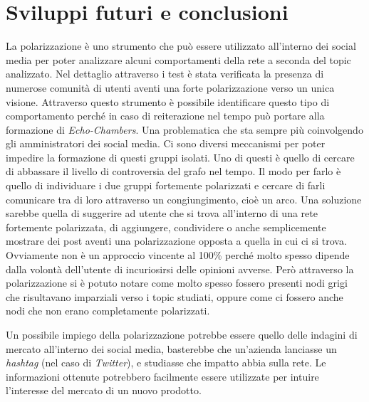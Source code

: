 \chapter{Sviluppi futuri e conclusioni}
\label{capitolo7}
\thispagestyle{empty}


La polarizzazione è uno strumento che può essere utilizzato all'interno dei social media per poter analizzare alcuni comportamenti della rete a seconda del topic analizzato. Nel dettaglio attraverso i test è stata verificata la presenza di numerose comunità di utenti aventi una forte polarizzazione verso un unica visione. Attraverso questo strumento è possibile identificare questo tipo di comportamento perché in caso di reiterazione nel tempo può portare alla formazione di \textit{Echo-Chambers}. Una problematica che sta sempre più coinvolgendo gli amministratori dei social media.
Ci sono diversi meccanismi per poter impedire la formazione di questi gruppi isolati. Uno di questi è quello di cercare di abbassare il livello di controversia del grafo nel tempo. Il modo per farlo è quello di individuare i due gruppi fortemente polarizzati e cercare di farli comunicare tra di loro attraverso un congiungimento, cioè un arco.
Una soluzione sarebbe quella di suggerire ad utente che si trova all'interno di una rete fortemente polarizzata, di aggiungere, condividere o anche semplicemente mostrare dei post aventi una polarizzazione opposta a quella in cui ci si trova. 
Ovviamente non è un approccio vincente al 100\% perché molto spesso dipende dalla volontà dell'utente di incuriosirsi delle opinioni avverse. Però attraverso la polarizzazione si è potuto notare come molto spesso fossero presenti nodi grigi che risultavano imparziali verso i topic studiati, oppure come ci fossero anche nodi che non erano completamente polarizzati.

Un possibile impiego della polarizzazione potrebbe essere quello delle indagini di mercato all'interno dei social media, basterebbe che un'azienda lanciasse un \textit{hashtag} (nel caso di \textit{Twitter}), e studiasse che impatto abbia sulla rete. Le informazioni ottenute potrebbero facilmente essere utilizzate per intuire l'interesse del mercato di un nuovo prodotto. 

